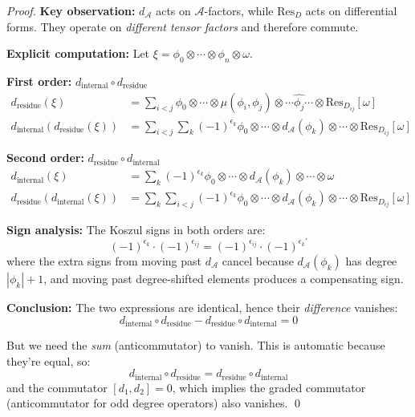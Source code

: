\begin{proof}
\textbf{Key observation:} $d_{\mathcal{A}}$ acts on $\mathcal{A}$-factors, while
$\text{Res}_D$ acts on differential forms. They operate on \emph{different tensor factors}
and therefore commute.

\textbf{Explicit computation:}
Let $\xi = \phi_0 \otimes \cdots \otimes \phi_n \otimes \omega$.

\textbf{First order:} $d_{\text{internal}} \circ d_{\text{residue}}$
\begin{align*}
d_{\text{residue}}(\xi) &= \sum_{i<j} \phi_0 \otimes \cdots \otimes \mu(\phi_i, \phi_j) 
\otimes \cdots \widehat{\phi_j} \cdots \otimes \text{Res}_{D_{ij}}[\omega]\\
d_{\text{internal}}(d_{\text{residue}}(\xi)) &= \sum_{i<j} \sum_k (-1)^{\epsilon_k} 
\phi_0 \otimes \cdots \otimes d_{\mathcal{A}}(\phi_k) \otimes \cdots \otimes 
\text{Res}_{D_{ij}}[\omega]
\end{align*}

\textbf{Second order:} $d_{\text{residue}} \circ d_{\text{internal}}$
\begin{align*}
d_{\text{internal}}(\xi) &= \sum_k (-1)^{\epsilon_k} \phi_0 \otimes \cdots \otimes 
d_{\mathcal{A}}(\phi_k) \otimes \cdots \otimes \omega\\
d_{\text{residue}}(d_{\text{internal}}(\xi)) &= \sum_k \sum_{i<j} (-1)^{\epsilon_k} 
\phi_0 \otimes \cdots \otimes d_{\mathcal{A}}(\phi_k) \otimes \cdots \otimes 
\text{Res}_{D_{ij}}[\omega]
\end{align*}

\textbf{Sign analysis:}
The Koszul signs in both orders are:
$$(-1)^{\epsilon_k} \cdot (-1)^{\epsilon_{ij}} = (-1)^{\epsilon_{ij}} \cdot (-1)^{\epsilon_k'}$$
where the extra signs from moving past $d_{\mathcal{A}}$ cancel because
$d_{\mathcal{A}}(\phi_k)$ has degree $|\phi_k| + 1$, and moving past degree-shifted
elements produces a compensating sign.

\textbf{Conclusion:} The two expressions are identical, hence their \emph{difference}
vanishes:
$$d_{\text{internal}} \circ d_{\text{residue}} - d_{\text{residue}} \circ 
d_{\text{internal}} = 0$$

But we need the \emph{sum} (anticommutator) to vanish. This is automatic because they're
equal, so:
$$d_{\text{internal}} \circ d_{\text{residue}} = d_{\text{residue}} \circ d_{\text{internal}}$$
and the commutator $[d_1, d_2] = 0$, which implies the graded commutator (anticommutator
for odd degree operators) also vanishes. \qed
\end{proof}

